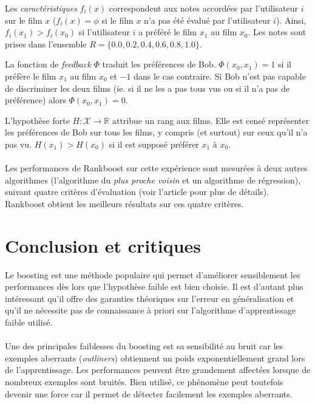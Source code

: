 \documentclass[pdftex,a4paper,11pt]{article}
\begin{document}
Les \emph{caractéristiques} $f_i(x)$ correspondent aux notes accordées par l'utilisateur $i$ sur le film $x$ ($f_i(x) = \phi$ si le film $x$ n'a pas été évalué par l'utilisateur $i$). Ainsi, $f_i(x_1) > f_i(x_0)$ si l'utilisateur $i$ a préféré le film $x_1$ au film $x_0$. Les notes sont prises dans l'ensemble $R = \{0.0, 0.2, 0.4, 0.6, 0.8, 1.0\}$.

La fonction de \emph{feedback} $\Phi$ traduit les préférences de Bob. %
$\Phi(x_0, x_1) = 1$ si il préfère le film $x_1$ au film $x_0$ et $-1$ dans le cas contraire.
Si Bob n'est pas capable de discriminer les deux films (ie. si il ne les a pas tous vus ou si il n'a pas de préférence) alors $\Phi(x_0, x_1) = 0$.

L'hypothèse forte $H : \mathcal{X} \to \mathbb{R}$ attribue un rang aux films. Elle est censé représenter les préférences de Bob sur tous les films, y compris (et surtout) sur ceux qu'il n'a pas vu. $H(x_1) > H(x_0)$ si il est supposé préférer $x_1$ à $x_0$.

\paragraph{}
Les performances de Rankboost sur cette expérience sont mesurées à deux autres algorithmes (l'algorithme du \emph{plus proche voisin} et un algorithme de régression), suivant quatre critères d'évaluation (voir l'article pour plus de détails).
Rankboost obtient les meilleurs résultats sur ces quatre critères.


\section{Conclusion et critiques}

Le boosting est une méthode populaire qui permet d'améliorer sensiblement les performances dès lors que l'hypothèse faible est bien choisie.
Il est d'autant plus intéressant qu'il offre des garanties théoriques sur l'erreur en généralisation et qu'il ne nécessite pas de connaissance à priori sur l'algorithme d'apprentissage \og{}faible\fg{} utilisé.

\paragraph{}
Une des principales faiblesses du boosting est sa sensibilité au bruit car les exemples aberrants (\emph{outliners}) obtiennent un poids exponentiellement grand lors de l'apprentissage. Les performances peuvent être grandement affectées lorsque de nombreux exemples sont bruités.
Bien utilisé, ce phénomène peut toutefois devenir une force car il permet de détecter facilement les exemples aberrants.
\end{document}
